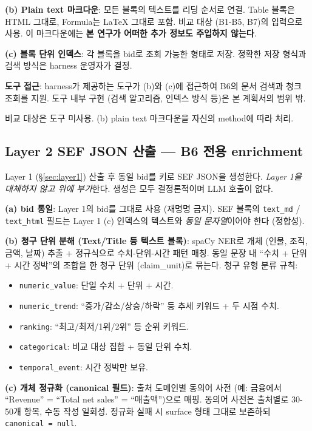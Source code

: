 \documentclass[11pt]{article}
\begin{document}
\textbf{(b) Plain text 마크다운}: 모든 블록의 텍스트를 리딩 순서로 연결. Table 블록은 HTML 그대로, Formula는 LaTeX 그대로 포함. 비교 대상 (B1-B5, B7)의 입력으로 사용. 이 마크다운에는 \textbf{본 연구가 어떠한 추가 정보도 주입하지 않는다}.

\textbf{(c) 블록 단위 인덱스}: 각 블록을 bid로 조회 가능한 형태로 저장. 정확한 저장 형식과 검색 방식은 harness 운영자가 결정.

\textbf{도구 접근}: harness가 제공하는 도구가 (b)와 (c)에 접근하여 B6의 문서 검색과 청크 조회를 지원. 도구 내부 구현 (검색 알고리즘, 인덱스 방식 등)은 본 계획서의 범위 밖.

비교 대상은 도구 미사용. (b) plain text 마크다운을 자신의 method에 따라 처리.

\subsection{Layer 2 SEF JSON 산출 — B6 전용 enrichment}
\label{sec:sef-build}

Layer 1 (\S\ref{sec:layer1}) 산출 후 동일 bid를 키로 SEF JSON을 생성한다. \emph{Layer 1을 대체하지 않고 위에 부가}한다. 생성은 모두 결정론적이며 LLM 호출이 없다.

\textbf{(a) bid 통일}: Layer 1의 bid를 그대로 사용 (재명명 금지). SEF 블록의 \texttt{text\_md} / \texttt{text\_html} 필드는 Layer 1 (c) 인덱스의 텍스트와 \emph{동일 문자열}이어야 한다 (정합성).

\textbf{(b) 청구 단위 분해 (Text/Title 등 텍스트 블록)}: spaCy NER로 개체 (인물, 조직, 금액, 날짜) 추출 + 정규식으로 수치-단위-시간 패턴 매칭. 동일 문장 내 ``수치 + 단위 + 시간 정박''의 조합을 한 청구 단위 (claim\_unit)로 묶는다. 청구 유형 분류 규칙:
\begin{itemize}[leftmargin=*]
    \item \texttt{numeric\_value}: 단일 수치 + 단위 + 시간.
    \item \texttt{numeric\_trend}: ``증가/감소/상승/하락'' 등 추세 키워드 + 두 시점 수치.
    \item \texttt{ranking}: ``최고/최저/1위/2위'' 등 순위 키워드.
    \item \texttt{categorical}: 비교 대상 집합 + 동일 단위 수치.
    \item \texttt{temporal\_event}: 시간 정박만 보유.
\end{itemize}

\textbf{(c) 개체 정규화 (canonical 필드)}: 출처 도메인별 동의어 사전 (예: 금융에서 ``Revenue'' = ``Total net sales'' = ``매출액'')으로 매핑. 동의어 사전은 출처별로 30-50개 항목, 수동 작성 일회성. 정규화 실패 시 surface 형태 그대로 보존하되 \texttt{canonical = null}.
\end{document}
